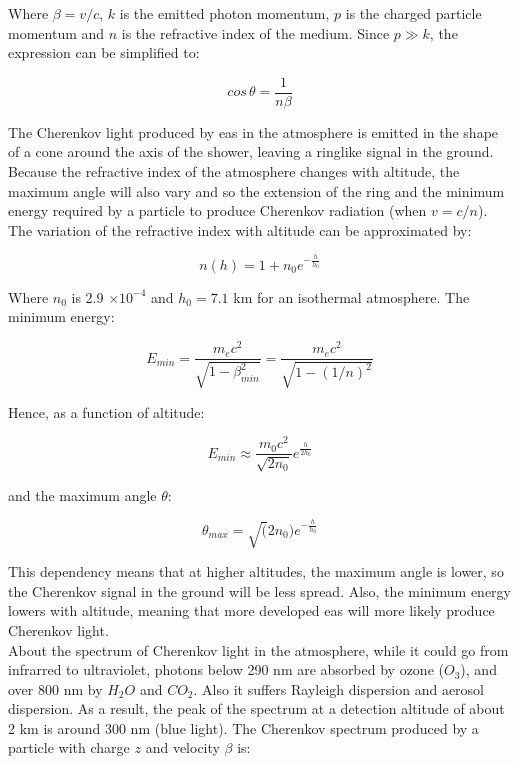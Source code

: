 \documentclass[main.tex]{subfiles}
\begin{document}
Where $\beta = v/c$, $k$ is the emitted photon momentum, $p$ is the charged particle momentum and $n$ is the refractive index of the medium. Since $p \gg k$, the expression can be simplified to:

\begin{equation}
  cos\,\theta = \frac{1}{n\beta}
\end{equation}

The Cherenkov light produced by \gls{eas} in the atmosphere is emitted in the shape of a cone around the axis of the shower, leaving a ringlike signal in the ground. Because the refractive index of the atmosphere changes with altitude, the maximum angle will also vary and so the extension of the ring and the minimum energy required by a particle to produce Cherenkov radiation (when $v = c/n$).
The variation of the refractive index with altitude can be approximated by:

\begin{equation}
  n(h) = 1+n_0e^{-\frac{h}{h_0}}
\end{equation}

Where $n_{0}$ is 2.9 $\times 10^{-4}$ and $h_0 = 7.1$ km for an isothermal atmosphere. The minimum energy:

\begin{equation}
  E_{min} = \frac{m_ec^2}{\sqrt{1-\beta_{min}^2}} = \frac{m_ec^2}{\sqrt{1-(1/n)^2}}
\end{equation}

Hence, as a function of altitude:

\begin{equation}
  E_{min} \approx \frac{m_0c^2}{\sqrt{2n_0}}e^{\frac{h}{2h_0}}
\end{equation}

and the maximum angle $\theta$:

\begin{equation}
  \theta_{max} = \sqrt(2n_0)e^{-\frac{h}{h_0}}
\end{equation}

This dependency means that at higher altitudes, the maximum angle is lower, so the Cherenkov signal in the ground will be less spread. Also, the minimum energy lowers with altitude, meaning that more developed \gls{eas} will more likely produce Cherenkov light.\\
About the spectrum of Cherenkov light in the atmosphere, while it could go from infrarred to ultraviolet, photons below 290 nm are absorbed by ozone ($O_3$), and over 800 nm by $H_2O$ and $CO_2$. Also it suffers Rayleigh dispersion and aerosol dispersion. As a result, the peak of the spectrum at a detection altitude of about 2 km is around 300 nm (blue light). The Cherenkov spectrum produced by a particle with charge $z$ and velocity $\beta$ is:
\end{document}
